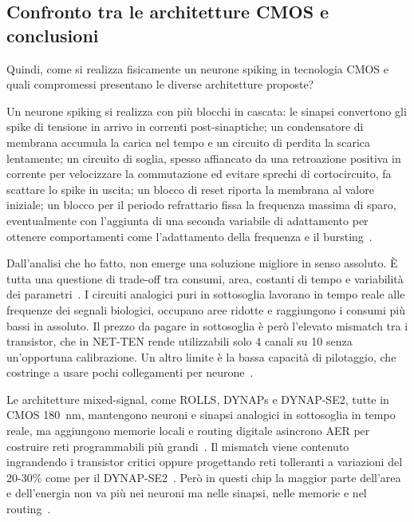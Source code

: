 \subsection{Confronto tra le architetture CMOS e conclusioni}
\label{subsec:tabelle_cmos}

Quindi, come si realizza fisicamente un neurone spiking in tecnologia CMOS e quali compromessi presentano le diverse architetture proposte?


Un neurone spiking si realizza con più blocchi in cascata: le sinapsi convertono gli spike di tensione in arrivo in correnti post-sinaptiche; un condensatore di membrana accumula la carica nel tempo e un circuito di perdita la scarica lentamente; un circuito di soglia, spesso affiancato da una retroazione positiva in corrente per velocizzare la commutazione ed evitare sprechi di cortocircuito, fa scattare lo spike in uscita; un blocco di reset riporta la membrana al valore iniziale; un blocco per il periodo refrattario fissa la frequenza massima di sparo, eventualmente con l'aggiunta di una seconda variabile di adattamento per ottenere comportamenti come l'adattamento della frequenza e il bursting~\cite{indiveri2011, qiao2015, ronchini2023}.

Dall'analisi che ho fatto, non emerge una soluzione migliore in senso assoluto. È tutta una questione di trade-off tra consumi, area, costanti di tempo e variabilità dei parametri~\cite{indiveri2011}. I circuiti analogici puri in sottosoglia lavorano in tempo reale alle frequenze dei segnali biologici, occupano aree ridotte e raggiungono i consumi più bassi in assoluto. Il prezzo da pagare in sottosoglia è però l'elevato mismatch tra i transistor, che in NET-TEN rende utilizzabili solo 4 canali su 10 senza un'opportuna calibrazione. Un altro limite è la bassa capacità di pilotaggio, che costringe a usare pochi collegamenti per neurone~\cite{indiveri2011, ronchini2023}.

Le architetture mixed-signal, come ROLLS, DYNAPs e DYNAP-SE2, tutte in CMOS \SI{180}{\nano\meter}, mantengono neuroni e sinapsi analogici in sottosoglia in tempo reale, ma aggiungono memorie locali e routing digitale asincrono AER per costruire reti programmabili più grandi~\cite{qiao2015, moradi2018, bartels2025}. Il mismatch viene contenuto ingrandendo i transistor critici oppure progettando reti tolleranti a variazioni del 20-30\% come per il DYNAP-SE2~\cite{qiao2015, bartels2025}. Però in questi chip la maggior parte dell'area e dell'energia non va più nei neuroni ma nelle sinapsi, nelle memorie e nel routing~\cite{qiao2015, moradi2018}.

